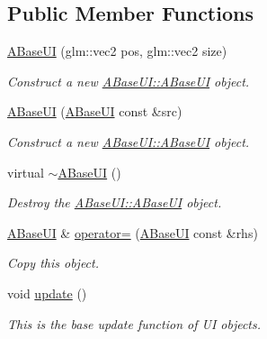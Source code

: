 \subsection*{Public Member Functions}
\begin{DoxyCompactItemize}
\item 
\hyperlink{class_a_base_u_i_a643d80d189018a179d2e3a938e3aa539}{A\+Base\+UI} (glm\+::vec2 pos, glm\+::vec2 size)
\begin{DoxyCompactList}\small\item\em Construct a new \hyperlink{class_a_base_u_i_a643d80d189018a179d2e3a938e3aa539}{A\+Base\+U\+I\+::\+A\+Base\+UI} object. \end{DoxyCompactList}\item 
\hyperlink{class_a_base_u_i_a43914df26b12e74becb41da8d85448f1}{A\+Base\+UI} (\hyperlink{class_a_base_u_i}{A\+Base\+UI} const \&src)
\begin{DoxyCompactList}\small\item\em Construct a new \hyperlink{class_a_base_u_i_a643d80d189018a179d2e3a938e3aa539}{A\+Base\+U\+I\+::\+A\+Base\+UI} object. \end{DoxyCompactList}\item 
\mbox{\label{class_a_base_u_i_ac2fd1305e127a9c547c37dd58f65742d}} 
virtual \hyperlink{class_a_base_u_i_ac2fd1305e127a9c547c37dd58f65742d}{$\sim$\+A\+Base\+UI} ()
\begin{DoxyCompactList}\small\item\em Destroy the \hyperlink{class_a_base_u_i_a643d80d189018a179d2e3a938e3aa539}{A\+Base\+U\+I\+::\+A\+Base\+UI} object. \end{DoxyCompactList}\item 
\hyperlink{class_a_base_u_i}{A\+Base\+UI} \& \hyperlink{class_a_base_u_i_af269cad7ae1f290964cdeeb3f84cdc89}{operator=} (\hyperlink{class_a_base_u_i}{A\+Base\+UI} const \&rhs)
\begin{DoxyCompactList}\small\item\em Copy this object. \end{DoxyCompactList}\item 
\mbox{\label{class_a_base_u_i_aa191d2729152b1b381cb4eba7d2b178e}} 
void \hyperlink{class_a_base_u_i_aa191d2729152b1b381cb4eba7d2b178e}{update} ()
\begin{DoxyCompactList}\small\item\em This is the base update function of UI objects. \end{DoxyCompactList}\item 

\end{DoxyCompactItemize}
